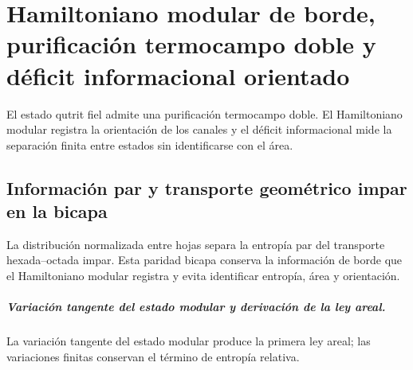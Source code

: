 \chapter{Hamiltoniano modular de borde, purificación termocampo doble y déficit informacional orientado}
\label{chap:parte-iv-60}

El estado qutrit fiel admite una purificación termocampo doble. El Hamiltoniano modular registra la orientación de los canales y el déficit informacional mide la separación finita entre estados sin identificarse con el área.



\section{Información par y transporte geométrico impar en la bicapa}

La distribución normalizada entre hojas separa la entropía par del transporte
hexada--octada impar. Esta paridad bicapa conserva la información de borde que
el Hamiltoniano modular registra y evita identificar entropía, área y
orientación.

\begingroup
\let\chapter\section
\let\section\subsection
\let\subsection\subsubsection
\let\subsubsection\paragraph
\let\clearpage\relax
\let\cleardoublepage\relax

\endgroup

\paragraph{Variación tangente del estado modular y derivación de la ley areal.} La variación tangente del estado modular produce la primera ley areal; las variaciones finitas conservan el término de entropía relativa.
